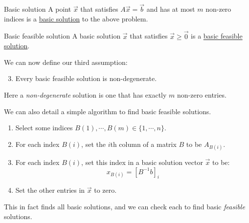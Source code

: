 \documentclass[../Main.tex]{subfiles}
\begin{document}
\begin{definition}{Basic solution}
    A point $\vec{x}$ that satisfies $A\vec{x} = \vec{b}$ and has at most $m$ non-zero indices is a \underline{basic solution} to the above problem.
\end{definition}
\begin{definition}{Basic feasible solution}
    A basic solution $\vec{x}$ that satisfies $\vec{x} \geq \vec{0}$ is a \underline{basic feasible solution}.
\end{definition}

We can now define our third assumption:
\begin{enumerate}
    \setcounter{enumi}{2}
    \item Every basic feasible solution is non-degenerate.
\end{enumerate}
Here a \textit{non-degenerate} solution is one that has exactly $m$ non-zero entries.

We can also detail a simple algorithm to find basic feasible solutions.
\begin{enumerate}
    \item Select some indices $B(1), \cdots, B(m) \in \{1, \cdots, n\}$.
    \item For each index $B(i)$, set the $i$th column of a matrix $B$ to be $A_{B(i)}$.
    \item For each index $B(i)$, set this index in a basic solution vector $\vec{x}$ to be:
        \begin{equation*}
            x_{B(i)} = \left[B^{-1} b\right]_i
        \end{equation*}
    \item Set the other entries in $\vec{x}$ to zero.
\end{enumerate}
This in fact finds all basic solutions, and we can check each to find basic \textit{feasible} solutions.
\end{document}
